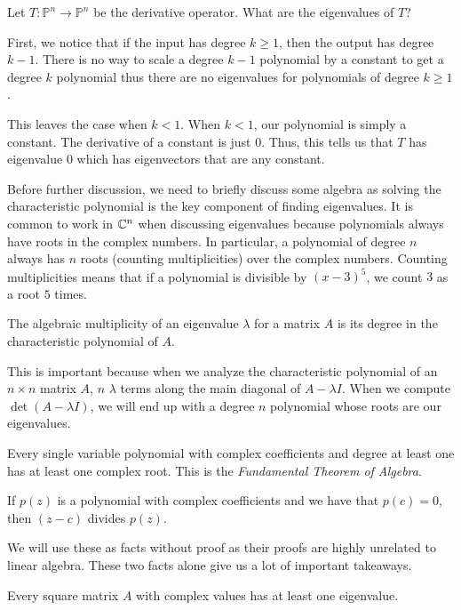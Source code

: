 \begin{example}
    Let $T: \mathbb{P}^n\to\mathbb{P}^n$ be the derivative operator. What are the eigenvalues of $T$?

    First, we notice that if the input has degree $k\geq 1$, then the output has degree $k-1$. There is no way to scale a degree $k-1$ polynomial by a constant to get a degree $k$ polynomial thus there are no eigenvalues for polynomials of degree $k\geq 1$.

    This leaves the case when $k<1$. When $k<1$, our polynomial is simply a constant. The derivative of a constant is just $0$. Thus, this tells us that $T$ has eigenvalue $0$ which has eigenvectors that are any constant.
\end{example}
Before further discussion, we need to briefly discuss some algebra as solving the characteristic polynomial is the key component of finding eigenvalues. It is common to work in $\mathbb{C}^n$ when discussing eigenvalues because polynomials always have roots in the complex numbers. In particular, a polynomial of degree $n$ always has $n$ roots (counting multiplicities) over the complex numbers. Counting multiplicities means that if a polynomial is divisible by $(x-3)^5$, we count $3$ as a root $5$ times.
\begin{definition}
    The algebraic multiplicity of an eigenvalue $\lambda$ for a matrix $A$ is its degree in the characteristic polynomial of $A$.
\end{definition}
This is important because when we analyze the characteristic polynomial of an $n\times n$ matrix $A$, $n$ $\lambda$ terms along the main diagonal of $A-\lambda I$. When we compute $\det(A-\lambda I)$, we will end up with a degree $n$ polynomial whose roots are our eigenvalues.
\begin{theorem}
    Every single variable polynomial with complex coefficients and degree at least one has at least one complex root. This is the \textit{Fundamental Theorem of Algebra}.
\end{theorem}
\begin{theorem}
    If $p(z)$ is a polynomial with complex coefficients and we have that $p(c)=0$, then $(z-c)$ divides $p(z)$.
\end{theorem}
We will use these as facts without proof as their proofs are highly unrelated to linear algebra. These two facts alone give us a lot of important takeaways.
\begin{corollary}
    Every square matrix $A$ with complex values has at least one eigenvalue.
\end{corollary}
